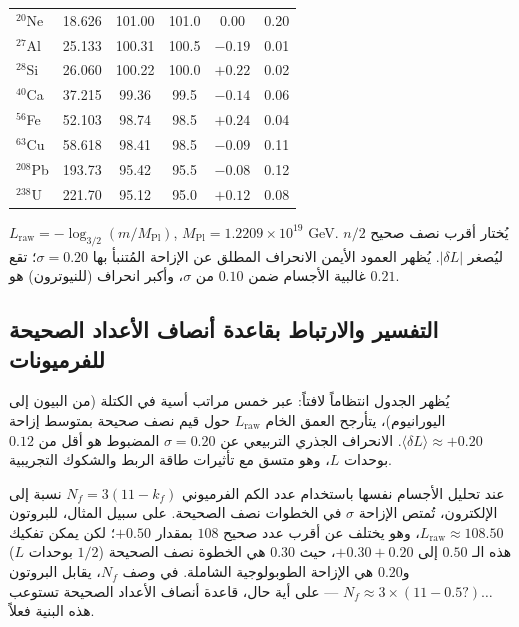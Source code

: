 \documentclass[12pt,a4paper]{article}
\begin{document}
\begin{otherlanguage}{english}
\begin{table}[htbp]
\begin{tabular}{l c c c c c}
				\(^{20}\)Ne & 18.626 & 101.00 & 101.0 & \(0.00\)  & 0.20 \\
				\(^{27}\)Al & 25.133 & 100.31 & 100.5 & \(-0.19\) & 0.01 \\
				\(^{28}\)Si & 26.060 & 100.22 & 100.0 & \(+0.22\) & 0.02 \\
				\(^{40}\)Ca & 37.215 & 99.36  & 99.5  & \(-0.14\) & 0.06 \\
				\(^{56}\)Fe & 52.103 & 98.74  & 98.5  & \(+0.24\) & 0.04 \\
				\(^{63}\)Cu & 58.618 & 98.41  & 98.5  & \(-0.09\) & 0.11 \\
				\(^{208}\)Pb & 193.73 & 95.42  & 95.5  & \(-0.08\) & 0.12 \\
				\(^{238}\)U & 221.70 & 95.12  & 95.0  & \(+0.12\) & 0.08 \\
				\bottomrule
			\end{tabular}
			\par\smallskip
			\footnotesize
			\(L_{\mathrm{raw}} = -\log_{3/2}(m/M_{\mathrm{Pl}})\), \(M_{\mathrm{Pl}} = 1.2209\times10^{19}\) GeV. يُختار أقرب نصف صحيح \(n/2\) ليُصغر \(|\delta L|\). يُظهر العمود الأيمن الانحراف المطلق عن الإزاحة المُتنبأ بها \(\sigma = 0.20\)؛ تقع غالبية الأجسام ضمن \(0.10\) من \(\sigma\)، وأكبر انحراف (للنيوترون) هو \(0.21\).
		\end{table}
	\end{otherlanguage}
	
	\subsection{التفسير والارتباط بقاعدة أنصاف الأعداد الصحيحة للفرميونات}
	يُظهر الجدول انتظاماً لافتاً: عبر خمس مراتب أسية في الكتلة (من البيون إلى اليورانيوم)، يتأرجح العمق الخام \(L_{\mathrm{raw}}\) حول قيم نصف صحيحة بمتوسط إزاحة \(\langle \delta L \rangle \approx +0.20\). الانحراف الجذري التربيعي عن \(\sigma = 0.20\) المضبوط هو أقل من \(0.12\) بوحدات \(L\)، وهو متسق مع تأثيرات طاقة الربط والشكوك التجريبية.
	
	عند تحليل الأجسام نفسها باستخدام عدد الكم الفرميوني \(N_f = 3(11 - k_f)\) نسبة إلى الإلكترون، تُمتص الإزاحة \(\sigma\) في الخطوات نصف الصحيحة. على سبيل المثال، للبروتون \(L_{\mathrm{raw}} \approx 108.50\)، وهو يختلف عن أقرب عدد صحيح \(108\) بمقدار \(+0.50\)؛ لكن يمكن تفكيك هذه الـ \(0.50\) إلى \(+0.30 + 0.20\)، حيث \(0.30\) هي الخطوة نصف الصحيحة (\(1/2\) بوحدات \(L\)) و\(0.20\) هي الإزاحة الطوبولوجية الشاملة. في وصف \(N_f\)، يقابل البروتون \(N_f \approx 3 \times (11 - 0.5?) \dots\) — على أية حال، قاعدة أنصاف الأعداد الصحيحة تستوعب هذه البنية فعلاً.
	
\end{document}
